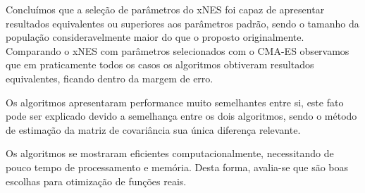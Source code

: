 Concluímos que a seleção de parâmetros do xNES foi capaz de apresentar resultados equivalentes ou superiores aos
parâmetros padrão, sendo o tamanho da população consideravelmente maior do que o proposto originalmente.
Comparando o xNES com parâmetros selecionados com o CMA-ES observamos que em praticamente todos os casos os algoritmos
obtiveram resultados equivalentes, ficando dentro da margem de erro.

Os algoritmos apresentaram performance muito semelhantes entre si, este fato pode ser explicado devido a semelhança entre
os dois algoritmos, sendo o método de estimação da matriz de covariância sua única diferença relevante.

Os algoritmos se mostraram eficientes computacionalmente, necessitando de pouco tempo de processamento e memória.
Desta forma, avalia-se que são boas escolhas para otimização de funções reais.
